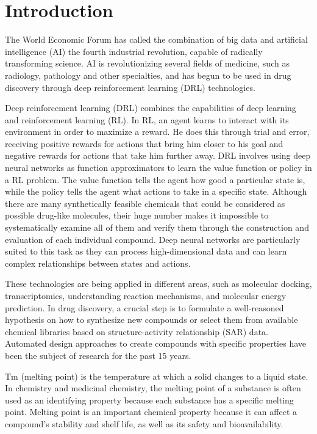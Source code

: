 \documentclass[a4paper]{article}
\begin{document}
\section{Introduction}\label{sec:intro}

The World Economic Forum has called the combination of big data and artificial intelligence (AI) the fourth industrial revolution, capable of radically transforming science. AI is revolutionizing several fields of medicine, such as radiology, pathology and other specialties, and has begun to be used in drug discovery through deep reinforcement learning (DRL) technologies. 


Deep reinforcement learning (DRL) combines the capabilities of deep learning and reinforcement learning (RL). In RL, an agent learns to interact with its environment in order to maximize a reward. He does this through trial and error, receiving positive rewards for actions that bring him closer to his goal and negative rewards for actions that take him further away. DRL involves using deep neural networks as function approximators to learn the value function or policy in a RL problem. The value function tells the agent how good a particular state is, while the policy tells the agent what actions to take in a specific state. Although there are many synthetically feasible chemicals that could be considered as possible drug-like molecules, their huge number makes it impossible to systematically examine all of them and verify them through the construction and evaluation of each individual compound. Deep neural networks are particularly suited to this task as they can process high-dimensional data and can learn complex relationships between states and actions. 


These technologies are being applied in different areas, such as molecular docking, transcriptomics, understanding reaction mechanisms, and molecular energy prediction.
In drug discovery, a crucial step is to formulate a well-reasoned hypothesis on how to synthesize new compounds or select them from available chemical libraries based on structure-activity relationship (SAR) data. Automated design approaches to create compounds with specific properties have been the subject of research for the past 15 years. 


Tm (melting point) is the temperature at which a solid changes to a liquid state. In chemistry and medicinal chemistry, the melting point of a substance is often used as an identifying property because each substance has a specific melting point. Melting point is an important chemical property because it can affect a compound's stability and shelf life, as well as its safety and bioavailability.
\end{document}
